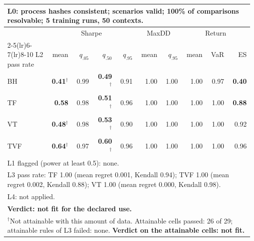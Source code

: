 \begin{tabular}{lrrrrrrrrr}
\toprule
\multicolumn{10}{p{13.5cm}}{L0: process hashes consistent; scenarios valid; 100\% of comparisons resolvable; 5 training runs, 50 contexts.} \\
\midrule
 & \multicolumn{4}{c}{Sharpe} & \multicolumn{2}{c}{MaxDD} & \multicolumn{3}{c}{Return} \\
\cmidrule(lr){2-5}\cmidrule(lr){6-7}\cmidrule(lr){8-10}
L2 pass rate & mean & $q_{.05}$ & $q_{.50}$ & $q_{.95}$ & mean & $q_{.95}$ & mean & VaR & ES \\
\midrule
BH & \textbf{0.41}$^{\dagger}$ & 0.99 & \textbf{0.49}$^{\dagger}$ & 0.91 & 1.00 & 1.00 & 1.00 & 0.97 & \textbf{0.40} \\
TF & \textbf{0.58} & 0.98 & \textbf{0.51}$^{\dagger}$ & 0.96 & 1.00 & 1.00 & 1.00 & 1.00 & \textbf{0.88} \\
VT & \textbf{0.48}$^{\dagger}$ & 0.98 & \textbf{0.53}$^{\dagger}$ & 0.90 & 1.00 & 1.00 & 1.00 & 1.00 & 0.92 \\
TVF & \textbf{0.64}$^{\dagger}$ & 0.97 & \textbf{0.60}$^{\dagger}$ & 0.96 & 1.00 & 1.00 & 1.00 & 1.00 & 0.96 \\
\midrule
\multicolumn{10}{p{13.5cm}}{L1 flagged (power at least 0.5): none.} \\
\multicolumn{10}{p{13.5cm}}{L3 pass rate: TF 1.00 (mean regret 0.001, Kendall 0.94); TVF 1.00 (mean regret 0.002, Kendall 0.88); VT 1.00 (mean regret 0.000, Kendall 0.98).} \\
\multicolumn{10}{p{13.5cm}}{L4: not applied.} \\
\multicolumn{10}{p{13.5cm}}{\textbf{Verdict: not fit for the declared use.}} \\
\multicolumn{10}{p{13.5cm}}{$^{\dagger}$Not attainable with this amount of data. Attainable cells passed: 26 of 29; attainable rules of L3 failed: none. \textbf{Verdict on the attainable cells: not fit.}} \\
\bottomrule
\end{tabular}
